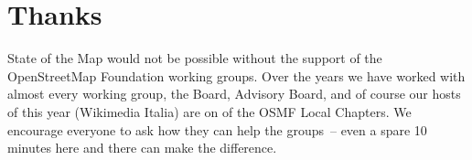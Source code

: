 \section*{Thanks}
\label{thanks}
\pagestyle{cropmarksstyle}

State of the Map would not be possible without the support of the OpenStreetMap Foundation working
groups. Over the years we have worked with almost every working group, the Board, Advisory Board,
and of course our hosts of this year (Wikimedia Italia) are on of the OSMF Local Chapters. We 
encourage everyone to ask how they can help the groups~-- even a spare 10 minutes here and there can
make the difference.

\enlargethispage{1\baselineskip}
\newlength{\volunteerSpace}
\setlength{}
\RaggedRight
